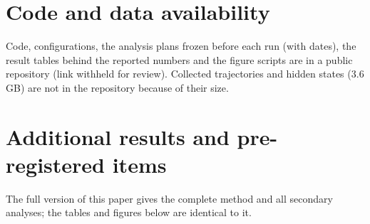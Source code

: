 \documentclass[10pt]{article}
\begin{document}
\section*{Code and data availability}
Code, configurations, the analysis plans frozen before each run (with dates), the result tables behind the reported numbers and the figure scripts are in a public repository (link withheld for review). Collected trajectories and hidden states (3.6 GB) are not in the repository because of their size.




\clearpage
\appendix
\section{Additional results and pre-registered items}
\setcounter{table}{0}
\setcounter{figure}{0}
The full version of this paper gives the complete method and all secondary analyses; the tables and figures below are identical to it.
















\end{document}
